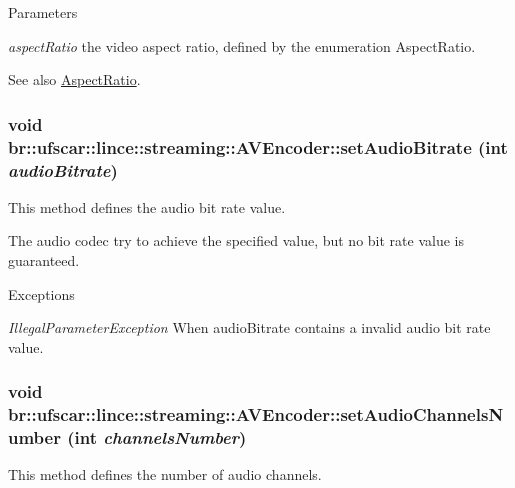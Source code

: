 \begin{DoxyParams}{Parameters}
\item[{\em aspectRatio}]the video aspect ratio, defined by the enumeration AspectRatio. \end{DoxyParams}
\begin{DoxySeeAlso}{See also}
\hyperlink{namespacebr_1_1ufscar_1_1lince_1_1streaming_a4b30a3170430e0fc8bacd10d9c602bb8}{AspectRatio}. 
\end{DoxySeeAlso}
\hypertarget{classbr_1_1ufscar_1_1lince_1_1streaming_1_1AVEncoder_a52fb49d7fb9013d931745b06f47d0511}{
\subsubsection[{setAudioBitrate}]{\setlength{\rightskip}{0pt plus 5cm}void br::ufscar::lince::streaming::AVEncoder::setAudioBitrate (int {\em audioBitrate})}}
\label{classbr_1_1ufscar_1_1lince_1_1streaming_1_1AVEncoder_a52fb49d7fb9013d931745b06f47d0511}


This method defines the audio bit rate value. 

The audio codec try to achieve the specified value, but no bit rate value is guaranteed. 
\begin{DoxyExceptions}{Exceptions}
\item[{\em IllegalParameterException}]When audioBitrate contains a invalid audio bit rate value. \end{DoxyExceptions}
\hypertarget{classbr_1_1ufscar_1_1lince_1_1streaming_1_1AVEncoder_ac8b1156deca2178845344f0460276423}{
\subsubsection[{setAudioChannelsNumber}]{\setlength{\rightskip}{0pt plus 5cm}void br::ufscar::lince::streaming::AVEncoder::setAudioChannelsNumber (int {\em channelsNumber})}}
\label{classbr_1_1ufscar_1_1lince_1_1streaming_1_1AVEncoder_ac8b1156deca2178845344f0460276423}


This method defines the number of audio channels. 


